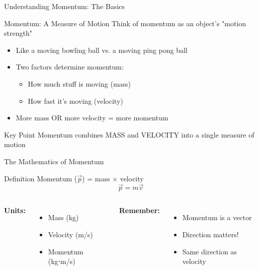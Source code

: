 \documentclass{beamer}
\begin{document}
\begin{frame}{Understanding Momentum: The Basics}
\begin{block}{Momentum: A Measure of Motion}
Think of momentum as an object's "motion strength"
\end{block}

\begin{itemize}
\item Like a moving bowling ball vs. a moving ping pong ball
\item Two factors determine momentum:
    \begin{itemize}
    \item How much stuff is moving (mass)
    \item How fast it's moving (velocity)
    \end{itemize}
\item More mass OR more velocity = more momentum
\end{itemize}

\begin{alertblock}{Key Point}
Momentum combines MASS and VELOCITY into a single measure of motion
\end{alertblock}
\end{frame}

\begin{frame}{The Mathematics of Momentum}
\begin{block}{Definition}
Momentum ($\vec{p}$) = mass × velocity
$$\vec{p} = m\vec{v}$$
\end{block}

\begin{columns}
\textbf{Units:}
\begin{itemize}
\item Mass (kg)
\item Velocity (m/s)
\item Momentum (kg⋅m/s)
\end{itemize}

\textbf{Remember:}
\begin{itemize}
\item Momentum is a vector
\item Direction matters!
\item Same direction as velocity
\end{itemize}
\end{columns}
\end{frame}
\end{document}
